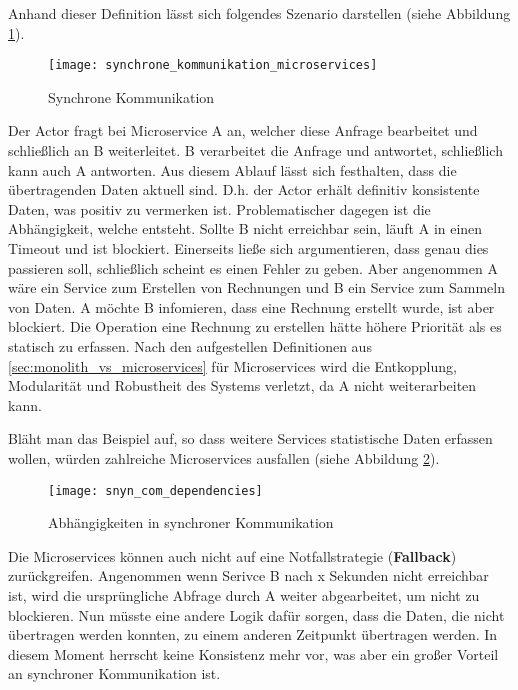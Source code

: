 Anhand dieser Definition lässt sich folgendes Szenario darstellen (siehe Abbildung \ref{fig:synchrone_kommunikation_microservices}). 

\begin{figure}[ht]
	\centering
	\texttt{[image: synchrone\_kommunikation\_microservices]}
	\caption[Synchrone Kommunikation] { Synchrone Kommunikation}
	\label{fig:synchrone_kommunikation_microservices}
\end{figure}

Der Actor fragt bei Microservice A an, welcher diese Anfrage bearbeitet und schließlich an B weiterleitet. B verarbeitet die Anfrage und antwortet, schließlich kann auch A antworten. Aus diesem Ablauf lässt sich festhalten, dass die übertragenden Daten aktuell sind. D.h. der Actor erhält definitiv konsistente Daten, was positiv zu vermerken ist. Problematischer dagegen ist die Abhängigkeit, welche entsteht. Sollte B nicht erreichbar sein, läuft A in einen Timeout und ist blockiert. Einerseits ließe sich argumentieren, dass genau dies passieren soll, schließlich scheint es einen Fehler zu geben. Aber angenommen A wäre ein Service zum Erstellen von Rechnungen und B ein Service zum Sammeln von Daten. A möchte B infomieren, dass eine Rechnung erstellt wurde, ist aber blockiert. Die Operation eine Rechnung zu erstellen hätte höhere Priorität als es statisch zu erfassen. Nach den aufgestellen Definitionen aus \ref{sec:monolith_vs_microservices} für Microservices wird die Entkopplung, Modularität und Robustheit des Systems verletzt, da A nicht weiterarbeiten kann.\cite{wolff2018mic_praxis} \cite{bruce2019mic_in_action}  

Bläht man das Beispiel auf, so dass weitere Services statistische Daten erfassen wollen, würden zahlreiche Microservices ausfallen (siehe Abbildung \ref{fig:snyn_com_dependencies}). \\

\begin{figure}[ht]
	\centering
	\texttt{[image: snyn\_com\_dependencies]}
	\caption[Abhängigkeiten in synchroner Kommunikation] { Abhängigkeiten in synchroner Kommunikation}
	\label{fig:snyn_com_dependencies}
\end{figure}

Die Microservices können auch nicht auf eine Notfallstrategie (\textbf{Fallback}) zurückgreifen. Angenommen wenn Serivce B nach x Sekunden nicht erreichbar ist, wird die ursprüngliche Abfrage durch A weiter abgearbeitet, um nicht zu blockieren. Nun müsste eine andere Logik dafür sorgen, dass die Daten, die nicht übertragen werden konnten, zu einem anderen Zeitpunkt übertragen werden. In diesem Moment herrscht keine Konsistenz mehr vor, was aber ein großer Vorteil an synchroner Kommunikation ist. \\

